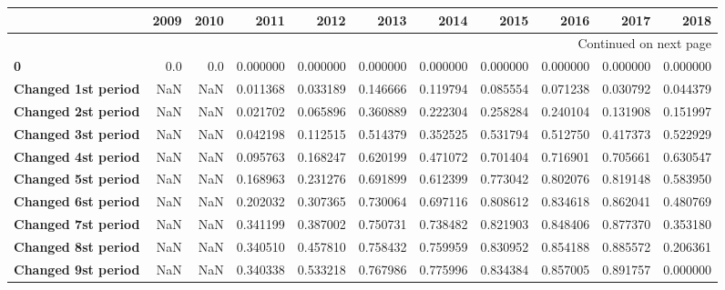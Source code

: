 \begin{longtable}{lrrrrrrrrrr}
\toprule
{} &  2009 &  2010 &         2011 &          2012 &          2013 &          2014 &          2015 &          2016 &         2017 &         2018 \\
\midrule
\endhead
\midrule
\multicolumn{11}{r}{{Continued on next page}} \\
\midrule
\endfoot

\bottomrule
\endlastfoot
\textbf{0                                 } &   0.0 &   0.0 &     0.000000 &      0.000000 &      0.000000 &      0.000000 &      0.000000 &      0.000000 &     0.000000 &     0.000000 \\
\textbf{Changed 1st period                } &   NaN &   NaN &     0.011368 &      0.033189 &      0.146666 &      0.119794 &      0.085554 &      0.071238 &     0.030792 &     0.044379 \\
\textbf{Changed 2st period                } &   NaN &   NaN &     0.021702 &      0.065896 &      0.360889 &      0.222304 &      0.258284 &      0.240104 &     0.131908 &     0.151997 \\
\textbf{Changed 3st period                } &   NaN &   NaN &     0.042198 &      0.112515 &      0.514379 &      0.352525 &      0.531794 &      0.512750 &     0.417373 &     0.522929 \\
\textbf{Changed 4st period                } &   NaN &   NaN &     0.095763 &      0.168247 &      0.620199 &      0.471072 &      0.701404 &      0.716901 &     0.705661 &     0.630547 \\
\textbf{Changed 5st period                } &   NaN &   NaN &     0.168963 &      0.231276 &      0.691899 &      0.612399 &      0.773042 &      0.802076 &     0.819148 &     0.583950 \\
\textbf{Changed 6st period                } &   NaN &   NaN &     0.202032 &      0.307365 &      0.730064 &      0.697116 &      0.808612 &      0.834618 &     0.862041 &     0.480769 \\
\textbf{Changed 7st period                } &   NaN &   NaN &     0.341199 &      0.387002 &      0.750731 &      0.738482 &      0.821903 &      0.848406 &     0.877370 &     0.353180 \\
\textbf{Changed 8st period                } &   NaN &   NaN &     0.340510 &      0.457810 &      0.758432 &      0.759959 &      0.830952 &      0.854188 &     0.885572 &     0.206361 \\
\textbf{Changed 9st period                } &   NaN &   NaN &     0.340338 &      0.533218 &      0.767986 &      0.775996 &      0.834384 &      0.857005 &     0.891757 &     0.000000 \\

\end{longtable}
